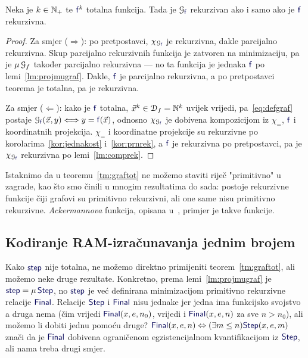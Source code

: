 \begin{teorem}\label{tm:graftot}
Neka je $k\in{\mathbb N}_+$ te $\f{f}^k$ totalna funkcija. Tada je $\graf{\f f}$ rekurzivan ako i samo ako je $\f f$ rekurzivna.
\end{teorem}
\begin{proof}
Za smjer ($\Rightarrow$): po pretpostavci, $\chi_{\graf{\f f}}$ je rekurzivna, dakle parcijalno rekurzivna. Skup parcijalno rekurzivnih funkcija je zatvoren na minimizaciju, pa je $\mu\,\mathcal G_{f}$ također parcijalno rekurzivna --- no ta funkcija je jednaka $\f f$ po lemi~\ref{lm:projmugraf}. Dakle, $\f f$ je parcijalno rekurzivna, a po pretpostavci teorema je totalna, pa je rekurzivna.

Za smjer ($\Leftarrow$): kako je $\f f$ totalna, $\vec x^k\in\mathcal D_{f}={\mathbb N}^k$ uvijek vrijedi, pa~\eqref{eq:defgraf} postaje $\graf{\f f}(\vec x,y)\Longleftrightarrow y=\f f(\vec x)$, odnosno $\chi_{\graf{\f f}}$ je dobivena kompozicijom iz $\chi_=$, $\f f$ i koordinatnih projekcija. $\chi_=$ i koordinatne projekcije su rekurzivne po korolarima~\ref{kor:jednakost} i~\ref{kor:prnrek}, a $\f f$ je rekurzivna po pretpostavci, pa je $\chi_{\graf{\f f}}$ rekurzivna po lemi~\ref{lm:comprek}.
\end{proof}

Istaknimo da u teoremu~\ref{tm:graftot} ne možemo staviti riječ "primitivno" u zagrade, kao što smo činili u mnogim rezultatima do sada: postoje rekurzivne funkcije čiji grafovi su primitivno rekurzivni, ali one same nisu primitivno rekurzivne. \emph{Ackermannova} funkcija, opisana u~\cite[dodatak]{skr:Vuk}, primjer je takve funkcije.

\subsection{Kodiranje RAM-izračunavanja jednim brojem}

Kako $\f{step}$ nije totalna, ne možemo direktno primijeniti teorem~\ref{tm:graftot}, ali možemo neke druge rezultate. Konkretno, prema lemi~\ref{lm:projmugraf} je $\f{step}=\mu\,\f{Step}$, no $\f{step}$ je već definirana minimizacijom primitivno rekurzivne relacije $\f{Final}$. Relacije $\f{Step}$ i $\f{Final}$ nisu jednake jer jedna ima funkcijsko svojstvo a druga nema (čim vrijedi $\f{Final}(x,e,n_0)$, vrijedi i $\f{Final}(x,e,n)$ za sve $n>n_0$), ali možemo li dobiti jednu pomoću druge? $\f{Final}(x,e,n)\Leftrightarrow(\exists m\le n)\f{Step}(x,e,m)$ znači da je $\f{Final}$ dobivena ograničenom egzistencijalnom kvantifikacijom iz $\f{Step}$, ali nama treba drugi smjer.

